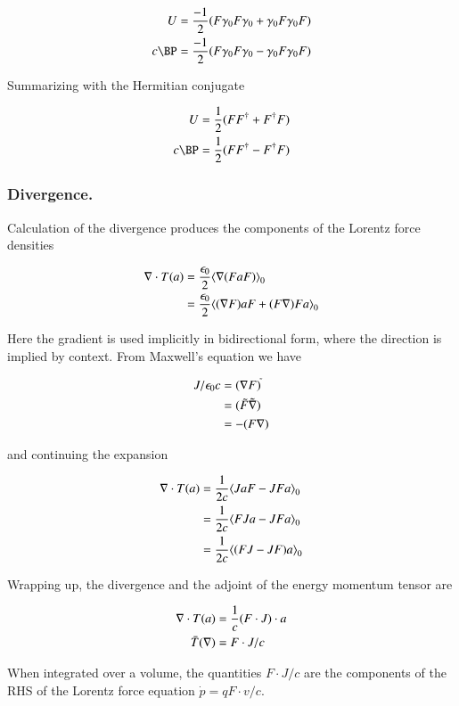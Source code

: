 \begin{align}
U &= \frac{-1}{2}( F \gamma_0 F \gamma_0 + \gamma_0 F \gamma_0 F) \\
c \BP &= \frac{-1}{2}( F \gamma_0 F \gamma_0 - \gamma_0 F \gamma_0 F)
\end{align}

Summarizing with the Hermitian conjugate

\begin{align}
U &= \frac{1}{2}( F F^\dagger + F^\dagger F) \\
c \BP &= \frac{1}{2}( F F^\dagger - F^\dagger F)
\end{align}

\subsubsection{ Divergence. }

Calculation of the divergence produces the components of the Lorentz force densities

\begin{align*}
\nabla \cdot T(a)
&= \frac{\epsilon_0}{2} {\left\langle{{ \nabla(F a F) }}\right\rangle}_{0} \\
&= \frac{\epsilon_0}{2} {\left\langle{{ (\nabla F) a F + (F \nabla) F a }}\right\rangle}_{0} \\
\end{align*}

Here the gradient is used implicitly in bidirectional form, where the direction is implied by context.  From Maxwell's equation we have

\begin{align*}
J/\epsilon_0 c
&= (\nabla F)^{\tilde{}} \\
&= (\tilde{F} \tilde{\nabla}) \\
&= -(F \nabla)
\end{align*}

and continuing the expansion

\begin{align*}
\nabla \cdot T(a)
&= \frac{1}{2c} {\left\langle{{ J a F - J F a }}\right\rangle}_{0} \\
&= \frac{1}{2c} {\left\langle{{ F J a - J F a }}\right\rangle}_{0} \\
&= \frac{1}{2c} {\left\langle{{ (F J - J F) a }}\right\rangle}_{0} \\
\end{align*}

Wrapping up, the divergence and the adjoint of the energy momentum tensor are

\begin{align}
\nabla \cdot T(a) &= \frac{1}{c} (F \cdot J) \cdot a \\
\bar{T}(\nabla) &= F \cdot J/c
\end{align}

When integrated over a volume, the quantities $F \cdot J/c$ are the components of the RHS of the Lorentz force equation $\dot{p} = q F \cdot v/c$.

\EndArticle
